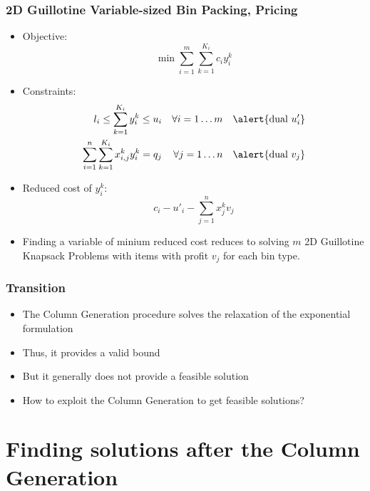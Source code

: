 \documentclass[10pt]{beamer}
\begin{document}
\begin{frame}
  \frametitle{2D Guillotine Variable-sized Bin Packing, Pricing}
  
  \begin{itemize}
    \item Objective:
      \begin{displaymath}
        \min \sum_{i = 1}^m \sum_{k = 1}^{K_i} c_i y_i^k
      \end{displaymath}

    \item Constraints:
      \begin{align*}
        l_i \le \sum_{k = 1}^{K_i} y_i^k \le u_i && \forall i = 1 \dots m && \alert{\text{dual } u'_i} \\
        \sum_{i = 1}^n \sum_{k = 1}^{K_i} x_{i, j}^k y_i^k = q_j && \forall j = 1 \dots n && \alert{\text{dual } v_j} \\
      \end{align*}

    \item \pause Reduced cost of $y_i^k$:
      \begin{displaymath}
        c_i - u'_i - \sum_{j = 1}^n x_j^k v_j
      \end{displaymath}

    \item \pause Finding a variable of minium reduced cost reduces to solving $m$ 2D Guillotine Knapsack Problems with items with profit $v_j$ for each bin type.
  \end{itemize}
\end{frame}

\begin{frame}
  \frametitle{Transition}

  \begin{itemize}
    \item The Column Generation procedure solves the relaxation of the exponential formulation
    \item \pause Thus, it provides a valid bound
    \item \pause But it generally does not provide a feasible solution
    \item \pause How to exploit the Column Generation to get feasible solutions?
  \end{itemize}
\end{frame}

\section{Finding solutions after the Column Generation}
\end{document}
